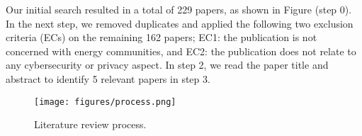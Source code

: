 
Our initial search resulted in a total of 229 papers, as shown in Figure (step 0). In the next step, we removed duplicates and applied the following two exclusion criteria (ECs) on the remaining 162 papers; EC1: the publication is not concerned with energy communities, and EC2: the publication does not relate to any cybersecurity or privacy aspect. In step 2, we read the paper title and abstract to identify 5 relevant papers in step 3.


\begin{figure}
    \centering
    \texttt{[image: figures/process.png]}
    \caption{Literature review process.}
    \label{fig:enter-label}
\end{figure}



